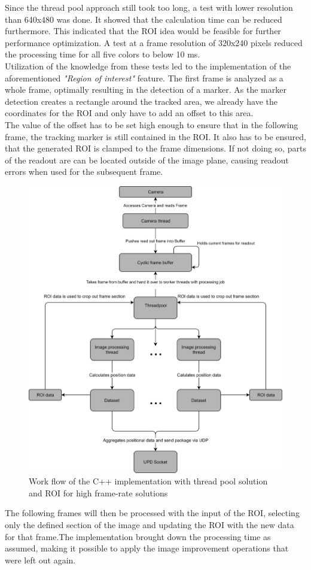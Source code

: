 Since the thread pool approach still took too long, a test with lower resolution than 640x480 was done. It showed that the calculation time can be reduced furthermore. This indicated that the ROI idea would be feasible for further performance optimization. A test at a frame resolution of 320x240 pixels reduced the processing time for all five colors to below 10 ms.\\Utilization of the knowledge from these tests led to the implementation of the aforementioned\textit{ "Region of interest"} feature.
The first frame is analyzed as a whole frame, optimally resulting in the detection of a marker. As the marker detection creates a rectangle around the tracked area, we already have the coordinates for the ROI and only have to add an offset to this area.
\\The value of the offset has to be set high enough to ensure that in the following frame, the tracking marker is still contained in the ROI. It also has to be ensured, that the generated ROI is clamped to the frame dimensions. If not doing so, parts of the readout are can be located outside of the image plane, causing readout errors when used for the subsequent frame.
\begin{figure}[H]
\centering
\includegraphics[width=\textwidth]{images/pi_workflow_500.jpg}
\caption{Work flow of the C++ implementation with thread pool solution and ROI for high frame-rate solutions}
\label{c++ work flow map} 
\end{figure} The following frames will then be processed with the input of the ROI, selecting only the defined section of the image and updating the ROI with the new data for that frame.The implementation brought down the processing time as assumed, making it possible to apply the image improvement operations that were left out again.
